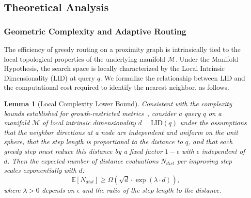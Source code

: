 \documentclass{article}
\theoremstyle{plain}
\newtheorem{lemma}[theorem]{Lemma}
\theoremstyle{definition}
\theoremstyle{remark}
\newtheorem{remark}[theorem]{Remark}
\begin{document}

\subsection{Theoretical Analysis}
\label{sec:theory}

\subsubsection{Geometric Complexity and Adaptive Routing}
\label{subsec:geometric_complexity}

The efficiency of greedy routing on a proximity graph is intrinsically tied to the local topological properties of the underlying manifold $\mathcal{M}$. Under the Manifold Hypothesis, the search space is locally characterized by the Local Intrinsic Dimensionality (LID) at query $q$. 
We formalize the relationship between LID and the computational cost required to identify the nearest neighbor, as follows.

\begin{lemma}[Local Complexity Lower Bound]
\label{lemma:complexity}
Consistent with the complexity bounds established for growth-restricted metrics~\cite{karger2002finding}, consider a query $q$ on a manifold $\mathcal{M}$ of local intrinsic dimensionality $d = \text{LID}(q)$ under the assumptions that the neighbor directions at a node are independent and uniform on the unit sphere, that the step length is proportional to the distance to $q$, and that each greedy step must reduce this distance by a fixed factor $1-\epsilon$ with $\epsilon$ independent of $d$. Then the expected number of distance evaluations $N_{dist}$ per improving step scales exponentially with $d$:
\begin{equation}
    \mathbb{E}[N_{dist}] \ge \Omega\left( \sqrt{d} \cdot \exp(\lambda \cdot d) \right),
\end{equation}
where $\lambda > 0$ depends on $\epsilon$ and the ratio of the step length to the distance.
\end{lemma}
\end{document}

